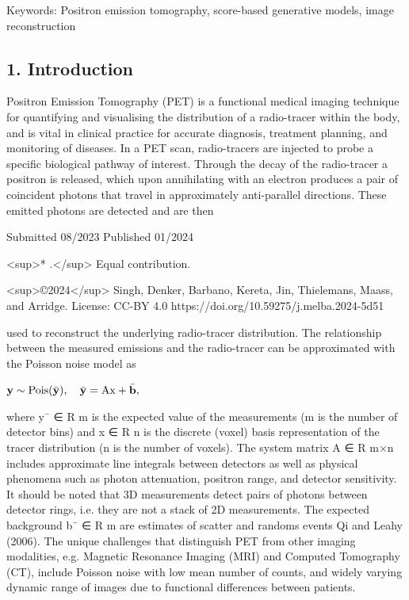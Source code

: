 \documentclass{article}
\begin{document}
Keywords: Positron emission tomography, score-based generative models, image reconstruction

\subsection{1. Introduction}

Positron Emission Tomography (PET) is a functional medical imaging technique for quantifying and visualising the distribution of a radio-tracer within the body, and is vital in clinical practice for accurate diagnosis, treatment planning, and monitoring of diseases. In a PET scan, radio-tracers are injected to probe a specific biological pathway of interest. Through the decay of the radio-tracer a positron is released, which upon annihilating with an electron produces a pair of coincident photons that travel in approximately anti-parallel directions. These emitted photons are detected and are then

Submitted 08/2023 Published 01/2024

<sup>* .</sup> Equal contribution.

<sup>©2024</sup> Singh, Denker, Barbano, Kereta, Jin, Thielemans, Maass, and Arridge. License: CC-BY 4.0 https://doi.org/10.59275/j.melba.2024-5d51

used to reconstruct the underlying radio-tracer distribution. The relationship between the measured emissions and the radio-tracer can be approximated with the Poisson noise model as

$\bf y\sim\rm{Pois}(\bar{\bf y}),\quad\bar{\bf y}=Ax+\bar{\bf b},$

where y¯ ∈ R m is the expected value of the measurements (m is the number of detector bins) and x ∈ R n is the discrete (voxel) basis representation of the tracer distribution (n is the number of voxels). The system matrix A ∈ R m×n includes approximate line integrals between detectors as well as physical phenomena such as photon attenuation, positron range, and detector sensitivity. It should be noted that 3D measurements detect pairs of photons between detector rings, i.e. they are not a stack of 2D measurements. The expected background b¯ ∈ R m are estimates of scatter and randoms events Qi and Leahy (2006). The unique challenges that distinguish PET from other imaging modalities, e.g. Magnetic Resonance Imaging (MRI) and Computed Tomography (CT), include Poisson noise with low mean number of counts, and widely varying dynamic range of images due to functional differences between patients.
\end{document}

